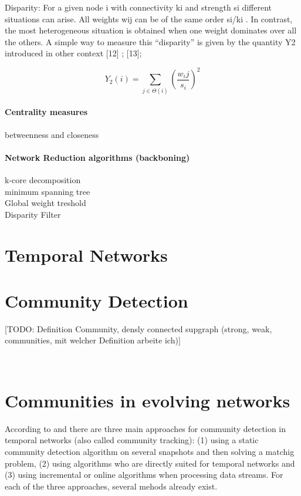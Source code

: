 Disparity: For a given node i   with connectivity  ki  and strength  si  different situations can arise. All weights  wij  can be of the same order  si/ki . In contrast, the most heterogeneous situation is obtained when one weight dominates over all the others. A simple way to measure this “disparity” is given by the quantity  Y2  introduced in other context [12] ;  [13];

$$Y_2(i)=\sum_{j\in \Theta(i)} (\frac{w_ij}{s_i})^2$$

\paragraph*{Centrality measures}
betweenness and closeness

\paragraph{Network Reduction algorithms (backboning)}
k-core decomposition\\
minimum spanning tree\\
Global weight treshold\\
Disparity Filter\\


\section{Temporal Networks}

\section{Community Detection}

[TODO: Definition Community, densly connected supgraph (strong, weak, communities, mit welcher Definition arbeite ich)]



~\cite{newman2006finding}\\

\section{Communities in evolving networks}
\label{sec:bg:tracking}
According to \textcite{aynaud2013communities} and \textcite{brodka2014community} there are three main approaches for community detection in temporal networks (also called community tracking): (1) using a static community detection algorithm on several snapshots and then solving a matchig problem, (2) using algorithms who are directly suited for temporal networks and (3) using incremental or online algorithms when processing data streams. For each of the three approaches, several mehods already exist.

